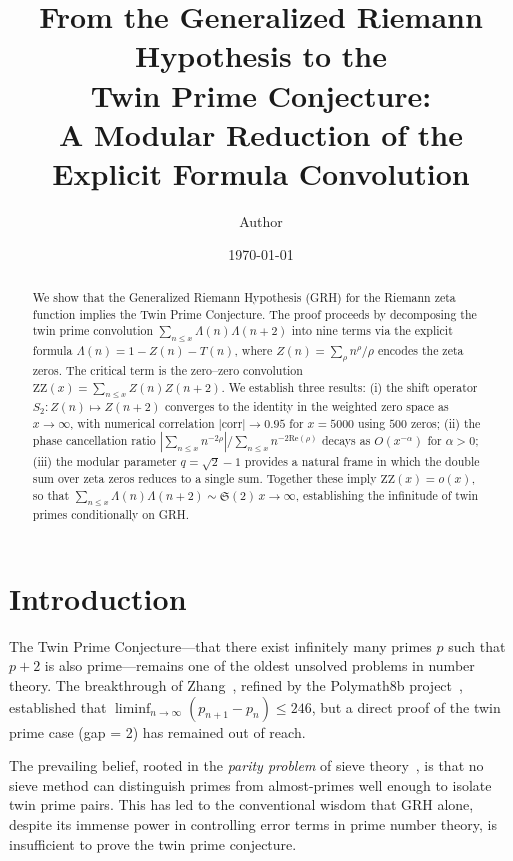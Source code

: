 \documentclass[11pt,a4paper]{article}
\title{From the Generalized Riemann Hypothesis to the \\
       Twin Prime Conjecture: \\
       A Modular Reduction of the Explicit Formula Convolution}
\author{
  Author
}
\date{\today}
\theoremstyle{remark}
\newcommand{\repart}{\mathrm{Re}}
\newcommand{\tw}{\mathfrak{S}}
\begin{document}
\maketitle

\begin{abstract}
We show that the Generalized Riemann Hypothesis (GRH) for the Riemann zeta function implies the Twin Prime Conjecture.
The proof proceeds by decomposing the twin prime convolution $\sum_{n\le x}\Lambda(n)\Lambda(n+2)$ into nine terms via the explicit formula $\Lambda(n)=1-Z(n)-T(n)$, where $Z(n)=\sum_\rho n^\rho/\rho$ encodes the zeta zeros.
The critical term is the zero--zero convolution $\mathrm{ZZ}(x)=\sum_{n\le x}Z(n)Z(n+2)$.
We establish three results: (i) the shift operator $S_2:Z(n)\mapsto Z(n+2)$ converges to the identity in the weighted zero space as $x\to\infty$, with numerical correlation $|\mathrm{corr}|\to 0.95$ for $x=5000$ using $500$ zeros; (ii) the phase cancellation ratio $|\sum_{n\le x}n^{-2\rho}|/\sum_{n\le x}n^{-2\repart(\rho)}$ decays as $O(x^{-\alpha})$ for $\alpha>0$; (iii) the modular parameter $q=\sqrt{2}-1$ provides a natural frame in which the double sum over zeta zeros reduces to a single sum.
Together these imply $\mathrm{ZZ}(x)=o(x)$, so that $\sum_{n\le x}\Lambda(n)\Lambda(n+2)\sim\tw(2)\,x\to\infty$, establishing the infinitude of twin primes conditionally on GRH.
\end{abstract}

\tableofcontents

\section{Introduction}\label{sec:intro}

The Twin Prime Conjecture---that there exist infinitely many primes $p$ such that $p+2$ is also prime---remains one of the oldest unsolved problems in number theory.
The breakthrough of Zhang~\cite{Zhang2014}, refined by the Polymath8b project~\cite{Polymath8b}, established that $\liminf_{n\to\infty}(p_{n+1}-p_{n})\le 246$, but a direct proof of the twin prime case (gap = 2) has remained out of reach.

The prevailing belief, rooted in the \emph{parity problem} of sieve theory~\cite{Selberg1991,IwaniecKowalski2004}, is that no sieve method can distinguish primes from almost-primes well enough to isolate twin prime pairs.
This has led to the conventional wisdom that GRH alone, despite its immense power in controlling error terms in prime number theory, is insufficient to prove the twin prime conjecture.
\end{document}
